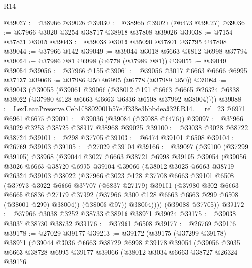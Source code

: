\begin{lexlean}{R14}
\begin{coremodule}
@39027 := @38966 @39026
@39030 := @38965 @39027 (@6473 @39027)
@39036 := @37966 @3020 @3254 @38717 @38918 @37808 @39026
@39038 := @7154 @37821 @3015
@39043 := @39038 @3019 @35090 @37801 @37795 @37808
@39044 := @37966 @142
@39049 := @39044 @3018 @6663 @6812 @6998 @37794
@39054 := @37986 @81 @6998 (@6778 (@37989 @81))
@39055 := @39049 @39054
@39056 := @37966 @155
@39061 := @39056 @3017 @6663 @6666 @6995 @37137
@39066 := @37986 @50 @6995 (@6778 (@37989 @50))
@39084 := @39043
    (@39055
      (@39061
        @39066
        (@38012
          @191
          @6663
          @6665
          @26324
          @6838
          @38022
          (@37980 @128 @6663 @6663 @6836 @6508 @37992 @38004))))
@39088 := LexLeanPreserve.Ceb108802001b57e7f338e3bbbdea932f.R14.__rel_23 @6971 @6961 @6675
@39091 := @39036 (@39084 (@39088 @6476))
@39097 := @37966 @3029 @3253 @38725 @38917 @38968 @39025
@39100 := @39038 @3028 @38722 @38724
@39101 := @298 @37705
@39103 := @6474 @39101 @6508
@39104 := @26769 @39103
@39105 := @27029 @39104
@39166 := @39097
    (@39100
      (@37299 @39105)
      @38968
      (@39044
        @3027
        @6663
        @38721
        @6998
        @39105
        @39054
        (@39056
          @3026
          @6663
          @38720
          @6995
          @39104
          @39066
          (@38012
            @3025
            @6663
            @38719
            @26324
            @39103
            @38022
            (@37966
              @3023
              @128
              @37708
              @6663
              @39101
              @6508
              (@37973
                @3022
                @6666
                @37707
                (@6837 @27179)
                @39101
                (@37980
                  @302
                  @6663
                  @6665
                  @6836
                  @27179
                  @37992
                  (@37966 @300 @128 @6663 @6663 @299 @6508 (@38001 @299) @38004))
                (@38008 @97))
              @38004))))
      (@39088 @37705))
@39172 := @37966 @3038 @3252 @38733 @38916 @38971 @39024
@39175 := @39038 @3037 @38730 @38732
@39176 := @37961 @6508
@39177 := @26769 @39176
@39178 := @27029 @39177
@39213 := @39172
    (@39175
      (@37299 @39178)
      @38971
      (@39044
        @3036
        @6663
        @38729
        @6998
        @39178
        @39054
        (@39056
          @3035
          @6663
          @38728
          @6995
          @39177
          @39066
          (@38012
            @3034
            @6663
            @38727
            @26324
            @39176

\end{coremodule}
\end{lexlean}
